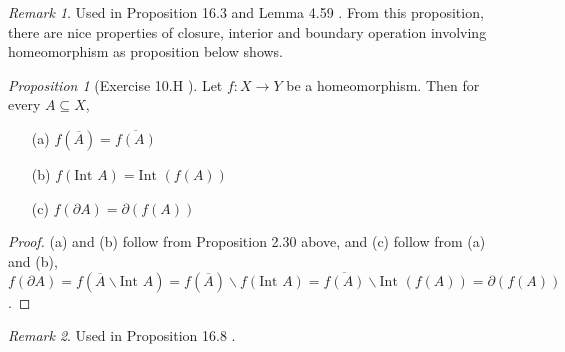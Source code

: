 \documentclass[a4paper]{article}
\theoremstyle{remark}
\newtheorem*{remark}{Remark}
\newtheorem{prop}{Proposition}
\newcommand{\doo}{\partial}    %
\newcommand{\subhim}{\subseteq} %
\newcommand{\Inter}{\text{Int }} %
\begin{document}
\begin{remark}
	Used in Proposition 16.3 \cite{LeeSM} and Lemma 4.59 \cite{LeeTM}. From this proposition, there are nice properties of closure, interior and boundary operation involving homeomorphism as proposition below shows.
\end{remark}

\begin{prop}[Exercise 10.H \cite{Viro}] Let $f : X \to Y$ be a homeomorphism. Then for every $A \subhim X$,
	\begin{enumerate}[nolistsep]
		\item[(a)] $ f(\overline{A}) = \overline{f(A)}$
		\item[(b)] $ f(\Inter A) = \Inter (f(A))$
		\item[(c)] $ f(\doo A) = \doo (f(A)) $
	\end{enumerate}
\end{prop}
\begin{proof}
	(a) and (b) follow from Proposition 2.30 above, and (c) follow from (a) and (b), $ f(\doo A) = f(\overline{A} \smallsetminus \Inter A) = f(\overline{A}) \smallsetminus f(\Inter A) = \overline{f(A)} \smallsetminus \Inter (f(A)) = \doo (f(A))$.
\end{proof}
\begin{remark}
	Used in Proposition 16.8 \cite{LeeSM}.
\end{remark}
\end{document}
